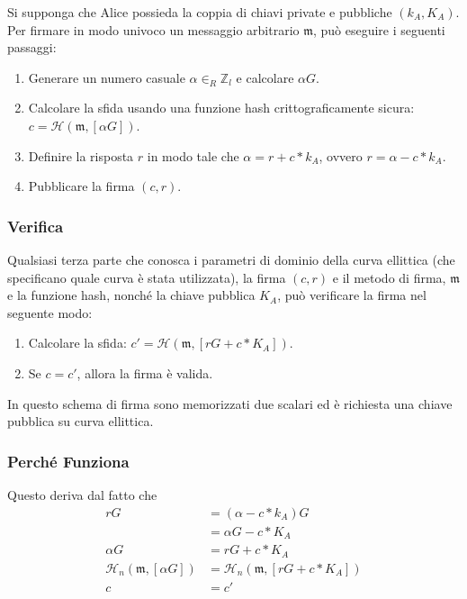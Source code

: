 Si supponga che Alice possieda la coppia di chiavi private e pubbliche \((k_A, K_A)\). Per firmare in modo univoco un messaggio arbitrario $\mathfrak{m}$, può eseguire i seguenti passaggi:

\begin{enumerate}
	\item Generare un numero casuale $\alpha \in_R \mathbb{Z}_l$ e calcolare $\alpha G$.
	\item Calcolare la sfida usando una funzione hash crittograficamente sicura: \(c = \mathcal{H}(\mathfrak{m},[\alpha G])\).
	\item Definire la risposta $r$ in modo tale che $\alpha = r + c*k_A$, ovvero $r = \alpha - c*k_A$.
	\item Pubblicare la firma $(c, r)$.
\end{enumerate}

\subsubsection*{Verifica}

Qualsiasi terza parte che conosca i parametri di dominio della curva ellittica (che specificano quale curva è stata utilizzata), la firma $(c, r)$ e il metodo di firma, $\mathfrak{m}$ e la funzione hash, nonché la chiave pubblica $K_A$, può verificare la firma nel seguente modo:

\begin{enumerate}
	\item Calcolare la sfida: \(c' = \mathcal{H}(\mathfrak{m},[r G + c*K_A])\).
	\item Se $c = c'$, allora la firma è valida.
\end{enumerate}

In questo schema di firma sono memorizzati due scalari ed è richiesta una chiave pubblica su curva ellittica.

\subsubsection*{Perché Funziona}

Questo deriva dal fatto che
\begin{align*}
  	 r G &= (\alpha - c*k_A) G \\
  	  	 &= \alpha G - c*K_A \\
\alpha G &= r G + c*K_A \\
\mathcal{H}_n(\mathfrak{m},[\alpha G]) &= \mathcal{H}_n(\mathfrak{m},[r G + c*K_A]) \\
       c &= c'
\end{align*}

